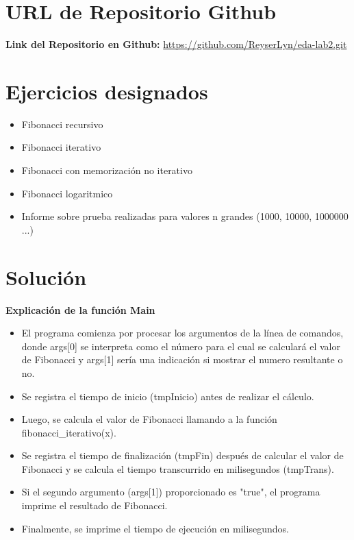 \documentclass{article}
\begin{document}
    \section{URL de Repositorio Github}
        \textbf{Link del Repositorio en Github: }    
            \url{https://github.com/ReyserLyn/eda-lab2.git}

	
    \section{Ejercicios designados}

    \begin{itemize}
        \item Fibonacci recursivo
        \item Fibonacci iterativo
        \item Fibonacci con memorización no iterativo
        \item Fibonacci logaritmico
        \item Informe sobre prueba realizadas para valores n grandes (1000, 10000, 1000000 ...)
    \end{itemize}

    \section{Solución}
    
        \textbf{Explicación de la función Main}\par  
            \begin{itemize}
                \item {El programa comienza por procesar los argumentos de la línea de comandos, donde args[0] se interpreta como el número para el cual se calculará el valor de Fibonacci y args[1] sería una indicación si mostrar el numero resultante o no.}
                \item {Se registra el tiempo de inicio (tmpInicio) antes de realizar el cálculo.}
                \item {Luego, se calcula el valor de Fibonacci llamando a la función fibonacci\_iterativo(x).}
                \item {Se registra el tiempo de finalización (tmpFin) después de calcular el valor de Fibonacci y se calcula el tiempo transcurrido en milisegundos (tmpTrans).}
                \item {Si el segundo argumento (args[1]) proporcionado es "true", el programa imprime el resultado de Fibonacci.}
                \item {Finalmente, se imprime el tiempo de ejecución en milisegundos.}
            \end{itemize}
            
\end{document}
